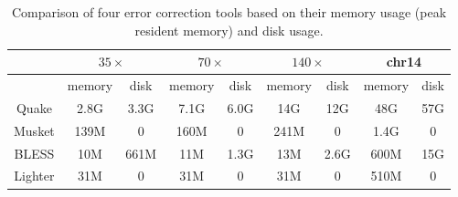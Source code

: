 \documentclass{bmcart}
\begin{document}
\begin{backmatter}
\begin{table}[h!] %
\caption{Comparison of four error correction tools based on their memory usage (peak resident memory) and disk usage.\label{table:memory_usage}}
\begin{tabular}{|c|c|c||c|c||c|c||c|c|} \hline
		& \multicolumn{2}{|c||}{$35\times$} & \multicolumn{2}{|c||}{$70\times$}  & \multicolumn{2}{|c||}{$140\times$} & \multicolumn{2}{|c|}{chr14}  \\ \hline
		& memory & disk & memory & disk & memory & disk & memory & disk \\ \hline
Quake   & 2.8G	& 3.3G & 7.1G & 6.0G & 14G & 12G & 48G & 57G \\ \hline		
Musket	& 139M	& 0 & 160M & 0 & 241M & 0 & 1.4G & 0 \\ \hline
BLESS	& 10M	& 661M & 11M & 1.3G & 13M & 2.6G & 600M & 15G \\ \hline
Lighter	& 31M	& 0 & 31M & 0 & 31M & 0 & 510M & 0 \\ \hline
\end{tabular}
\end{table}

\end{backmatter}
\end{document}
